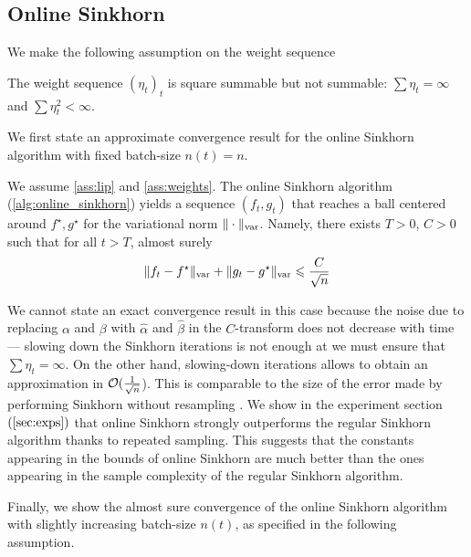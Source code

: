 \subsection{Online Sinkhorn}

We make the following \citet{robbins1951stochastic} assumption on the weight sequence

\begin{assumption}\label{ass:weights}
    The weight sequence ${(\eta_t)}_t$ is square summable but not summable: 
    $\sum \eta_t = \infty$ and $\sum \eta_t^2 < \infty$.
\end{assumption}


We first state an approximate convergence result for the online Sinkhorn algorithm with fixed batch-size $n(t) = n$.

\begin{proposition}\label{prop:convergence_bis}
    We assume \autoref{ass:lip} and \ref{ass:weights}. The online Sinkhorn algorithm (\autoref{alg:online_sinkhorn}) yields a sequence $(f_t, g_t)$ that reaches a
    ball centered around $f^\star, g^\star$ for the variational norm $\Vert
    \cdot \Vert_{\text{\upshape var}}$.
     Namely, there exists $T > 0$, $C > 0$ such that for all $t > T$, almost surely
    \begin{equation}
        \Vert f_t - f^\star \Vert_{\text{\upshape var}}
        + \Vert g_t - g^\star \Vert_{\text{\upshape var}} 
        \leqslant \frac{C}{\sqrt{n}} 
    \end{equation}
\end{proposition}
We cannot state an exact convergence result in this case because the noise due
to replacing $\alpha$ and $\beta$ with $\hat \alpha$ and $\hat \beta$ in the
$C$-transform does not decrease with time --- slowing down the Sinkhorn
iterations is not enough at we must ensure that $\sum \eta_t = \infty$. On the
other hand, slowing-down iterations allows to obtain an approximation in
$\mathcal{O}(\frac{1}{\sqrt{n}}$). This is comparable to the size of the error made by
performing Sinkhorn without resampling \citep{2019-Genevay-aistats}.  We show in
the experiment section $(\autoref{sec:exps})$ that online Sinkhorn strongly
outperforms the regular Sinkhorn algorithm thanks to repeated sampling. This
suggests that the constants appearing in the bounds of online Sinkhorn are much
better than the ones appearing in the sample complexity of the regular Sinkhorn
algorithm.

Finally, we show the almost sure convergence of the online Sinkhorn algorithm
with slightly increasing batch-size $n(t)$, as specified in the following
assumption.

